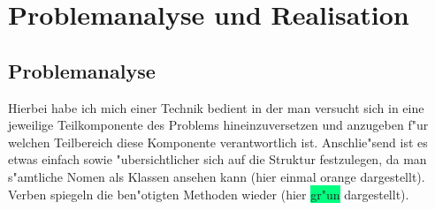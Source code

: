 \section{Problemanalyse und Realisation}
\label{sec:analyseUndRealisation}
\subsection{Problemanalyse}
Hierbei habe ich mich einer Technik bedient in der man versucht sich in eine jeweilige Teilkomponente des Problems hineinzuversetzen und anzugeben f"ur welchen Teilbereich diese Komponente verantwortlich ist. Anschlie"send ist es etwas einfach sowie "ubersichtlicher sich auf die Struktur festzulegen, da man s"amtliche Nomen als Klassen ansehen kann (hier einmal \colorbox{Apricot}{orange} dargestellt). Verben spiegeln die ben"otigten Methoden wieder (hier \colorbox{SpringGreen}{gr"un} dargestellt).

